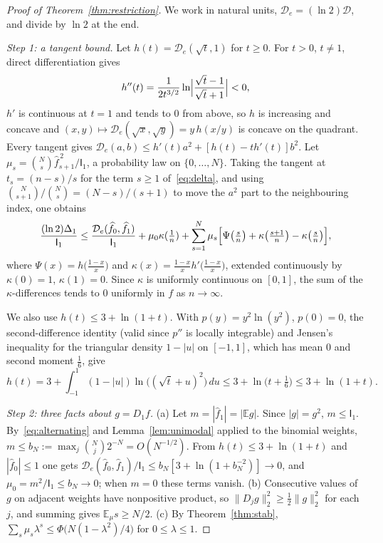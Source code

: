 \documentclass[11pt]{amsart}
\theoremstyle{definition}
\theoremstyle{remark}
\newcommand{\E}{\mathbb E}
\newcommand{\I}{\mathsf I}
\newcommand{\wh}[1]{\widehat{#1}}
\begin{document}
\begin{proof}[Proof of Theorem~\ref{thm:restriction}]
We work in natural units, $\mathcal D_e=(\ln2)\mathcal D$, and divide by $\ln2$ at the end.

\emph{Step 1: a tangent bound.} Let $h(t)=\mathcal D_e(\sqrt t,1)$ for $t\ge0$. For $t>0$, $t\ne1$, direct differentiation gives
\[
 h''(t)=\frac{1}{2t^{3/2}}\ln\Bigl|\frac{\sqrt t-1}{\sqrt t+1}\Bigr|<0,
\]
$h'$ is continuous at $t=1$ and tends to $0$ from above, so $h$ is increasing and concave and $(x,y)\mapsto\mathcal D_e(\sqrt x,\sqrt y)=y\,h(x/y)$ is concave on the quadrant. Every tangent gives $\mathcal D_e(a,b)\le h'(t)a^2+[h(t)-th'(t)]b^2$. Let $\mu_s=\binom Ns\wh f_{s+1}^{\,2}/\I_1$, a probability law on $\{0,\dots,N\}$. Taking the tangent at $t_s=(n-s)/s$ for the term $s\ge1$ of~\eqref{eq:delta}, and using $\binom N{s+1}/\binom Ns=(N-s)/(s+1)$ to move the $a^2$ part to the neighbouring index, one obtains
\[
 \frac{(\ln 2)\Delta_1}{\I_1}\le \frac{\mathcal D_e(\wh f_0,\wh f_1)}{\I_1}+\mu_0\kappa(\tfrac1n)+\sum_{s=1}^N\mu_s\Bigl[\Psi\bigl(\tfrac sn\bigr)+\kappa\bigl(\tfrac{s+1}n\bigr)-\kappa\bigl(\tfrac sn\bigr)\Bigr],
\]
where $\Psi(x)=h\bigl(\frac{1-x}x\bigr)$ and $\kappa(x)=\frac{1-x}xh'\bigl(\frac{1-x}x\bigr)$, extended continuously by $\kappa(0)=1$, $\kappa(1)=0$. Since $\kappa$ is uniformly continuous on $[0,1]$, the sum of the $\kappa$-differences tends to $0$ uniformly in $f$ as $n\to\infty$.

We also use $h(t)\le3+\ln(1+t)$. With $p(y)=y^2\ln(y^2)$, $p(0)=0$, the second-difference identity (valid since $p''$ is locally integrable) and Jensen's inequality for the triangular density $1-|u|$ on $[-1,1]$, which has mean $0$ and second moment $\tfrac16$, give
\[
 h(t)=3+\int_{-1}^1(1-|u|)\ln\bigl((\sqrt t+u)^2\bigr)\,du\le3+\ln\bigl(t+\tfrac16\bigr)\le3+\ln(1+t).
\]

\emph{Step 2: three facts about $g=D_1f$.} (a) Let $m=|\wh f_1|=|\E g|$. Since $|g|=g^2$, $m\le\I_1$. By~\eqref{eq:alternating} and Lemma~\ref{lem:unimodal} applied to the binomial weights, $m\le b_N:=\max_j\binom Nj2^{-N}=O(N^{-1/2})$. From $h(t)\le3+\ln(1+t)$ and $|\wh f_0|\le1$ one gets $\mathcal D_e(\wh f_0,\wh f_1)/\I_1\le b_N[3+\ln(1+b_N^{-2})]\to0$, and $\mu_0=m^2/\I_1\le b_N\to0$; when $m=0$ these terms vanish. (b) Consecutive values of $g$ on adjacent weights have nonpositive product, so $\|D_jg\|_2^2\ge\frac12\|g\|_2^2$ for each $j$, and summing gives $\E_\mu s\ge N/2$. (c) By Theorem~\ref{thm:stab}, $\sum_s\mu_s\lambda^s\le\Phi\bigl(N(1-\lambda^2)/4\bigr)$ for $0\le\lambda\le1$.


\end{proof}
\end{document}
